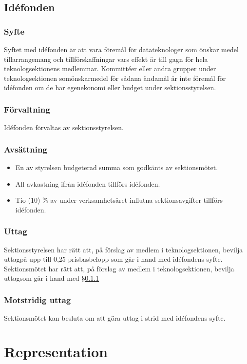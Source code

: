 \documentclass[a4paper, 10pt]{article}
\begin{document}
\subsection{Idéfonden}
\subsubsection{Syfte}
\label{sec:idefond_syfte}
Syftet med idéfonden är att vara föremål för datateknologer som önskar medel tillarrangemang och tillförskaffningar vars effekt är till gagn för hela teknologsektionens medlemmar. Kommittéer eller andra grupper under teknologsektionen somönskarmedel för sådana ändamål är inte föremål för idéfonden om de har egenekonomi eller budget under sektionsstyrelsen.
\subsubsection{Förvaltning}
Idéfonden förvaltas av sektionsstyrelsen.
\subsubsection{Avsättning}
\begin{itemize}
\item En av styrelsen budgeterad summa som godkänts av sektionsmötet.
\item All avkastning ifrån idéfonden tillförs idéfonden.
\item Tio (10) \% av under verksamhetsåret influtna sektionsavgifter tillförs idéfonden.
\end{itemize}
\subsubsection{Uttag}
Sektionsstyrelsen har rätt att, på förslag av medlem i teknologsektionen, bevilja uttagpå upp till 0,25 prisbasbelopp som går i hand med idéfondens syfte. Sektionsmötet har rätt att, på förslag av medlem i teknologsektionen, bevilja uttagsom går i hand med \S\ref{sec:idefond_syfte}
\subsubsection{Motstridig uttag}
Sektionsmötet kan besluta om att göra uttag i strid med idéfondens syfte.

\section{Representation}
\end{document}
